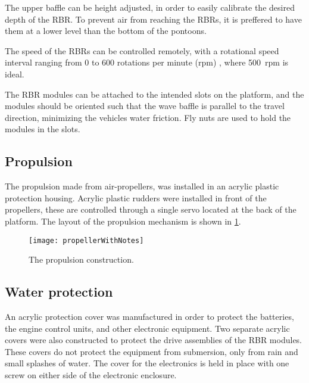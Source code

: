 The upper baffle can be height adjusted, in order to easily calibrate the desired depth of the RBR. To prevent air from reaching the RBRs, it is preffered to have them at a lower level than the bottom of the pontoons.


The speed of the RBRs can be controlled remotely, with a rotational speed interval ranging from 0 to 600 rotations per minute (rpm) , where 500~rpm is ideal.


The RBR modules can be attached to the intended slots on the platform, and the modules should be oriented such that the wave baffle is parallel to the travel direction, minimizing the vehicles water friction. Fly nuts are used to hold the modules in the slots. 

\subsection{Propulsion}
The propulsion made from air-propellers, was installed in an acrylic plastic protection housing. Acrylic plastic rudders were installed in front of the propellers, these are controlled through a single servo located at the back of the platform. The layout of the propulsion mechanism is shown in \cref{fig:propellerWithNotes}.

\begin{figure}[h]
   \centering
   \texttt{[image: propellerWithNotes]}
   \caption{The propulsion construction.}
   \label{fig:propellerWithNotes}
\end{figure}

\subsection{Water protection}

An acrylic protection cover was manufactured in order to protect the batteries, the engine control units, and other electronic equipment. Two separate acrylic covers were also constructed to protect the drive assemblies of the RBR modules. These covers do not protect the equipment from submersion, only from rain and small splashes of water. %
The cover for the electronics is held in place with one screw on either side of the electronic enclosure.

